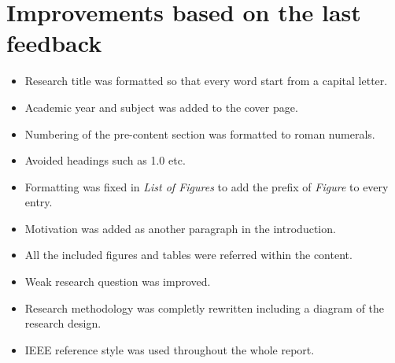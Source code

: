 \chapter{Improvements based on the last feedback}

\begin{itemize}
    \item Research title was formatted so that every word start from a capital letter. 
    \item Academic year and subject was added to the cover page. 
    \item Numbering of the pre-content section was formatted to roman numerals. 
    \item Avoided headings such as 1.0 etc. 
    \item Formatting was fixed in \emph{List of Figures} to add the prefix of \emph{Figure} to every entry. 
    \item Motivation was added as another paragraph in the introduction. 
    \item All the included figures and tables were referred within the content. 
    \item Weak research question was improved. 
    \item Research methodology was completly rewritten including a diagram of the research design. 
    \item IEEE reference style was used throughout the whole report. 
\end{itemize}